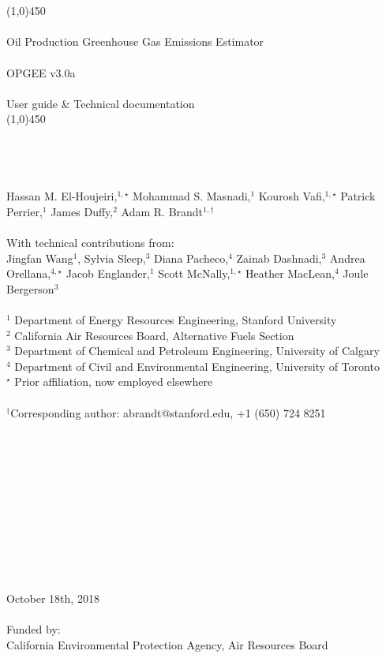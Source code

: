 \documentclass[11pt]{report}
\newcommand{\arbtitle}[1]{\textrm{\Large{#1}}}
\newcommand{\version}{v3.0a}
\begin{document}
\thispagestyle{plain}
\noindent \arbtitle{\\
\\
\linethickness{0.6mm} \line(1,0){450}\\
\\
{{\textcolor{stanford}{Oil Production Greenhouse Gas Emissions Estimator \\
\\
OPGEE \version \;\\ 
\\
\large{User guide \& Technical documentation} }}}}
\\
\linethickness{0.6mm} \line(1,0){450}\\
\\
\\
\noindent 
\textrm{\\
\\
Hassan M. El-Houjeiri,$^{1,\star}$ Mohammad S. Masnadi,$^1$ Kourosh Vafi,$^{1,\star}$ Patrick Perrier,$^{1}$ James Duffy,$^2$ Adam R. Brandt$^{1,\dagger}$\\
\\
With technical contributions from:\\
Jingfan Wang$^1$, Sylvia Sleep,$^3$  Diana Pacheco,$^4$ Zainab Dashnadi,$^3$ Andrea Orellana,$^{4,\star}$ Jacob Englander,$^1$ Scott McNally,$^{1,\star}$ Heather MacLean,$^4$ Joule Bergerson$^3$\\
\\
$^1$ Department of Energy Resources Engineering, Stanford University \\
$^2$ California Air Resources Board, Alternative Fuels Section\\
$^3$ Department of Chemical and Petroleum Engineering, University of Calgary\\
$^4$ Department of Civil and Environmental Engineering, University of Toronto\\
$^\star$ Prior affiliation, now employed elsewhere
\\
\\
$^{\dagger}$Corresponding author: abrandt@stanford.edu, +1 (650) 724 8251
\\
\\
\\
\\
\\
\\
\\
\\
\\
\\
\\
\\
October 18th, 2018\\
\\
Funded by:\\
California Environmental Protection Agency, Air Resources Board}
\end{document}

